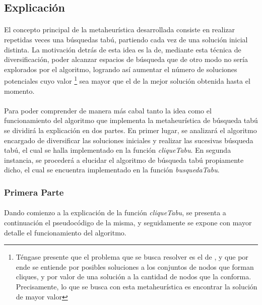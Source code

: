 \subsection{Explicación}

\paragraph{}
El concepto principal de la metaheurística desarrollada consiste en realizar repetidas veces una búsquedas tabú, partiendo cada vez de una solución inicial distinta. La motivación detrás de esta idea es la de, mediante esta técnica de diversificación, poder alcanzar espacios de búsqueda que de otro modo no sería explorados por el algoritmo, logrando así aumentar el número de soluciones potenciales cuyo valor \footnote{Téngase presente que el problema que se busca resolver es el de \mc, y que por ende se entiende por posibles soluciones a los conjuntos de nodos que forman cliques, y por valor de una solución a la cantidad de nodos que la conforma. Precisamente, lo que se busca con esta metaheurística es encontrar la solución de mayor valor} sea mayor que el de la mejor solución obtenida hasta el momento.

\paragraph{}
Para poder comprender de manera más cabal tanto la idea como el funcionamiento del algoritmo que implementa la metaheurística de búsqueda tabú se dividirá la explicación en dos partes. En primer lugar, se analizará el algoritmo encargado de diversificar las soluciones iniciales y realizar las sucesivas búsqueda tabú, el cual se halla implementado en la función \textit{cliqueTabu}. En segunda instancia, se procederá a elucidar el algoritmo de búsqueda tabú propiamente dicho, el cual se encuentra implementado en la función \textit{busquedaTabu}. 
\subsubsection{Primera Parte}
\paragraph{}
Dando comienzo a la explicación de la función \textit{cliqueTabu}, se presenta a continuación el pseudocódigo de la misma, y seguidamente se expone con mayor detalle el funcionamiento del algoritmo. \\

